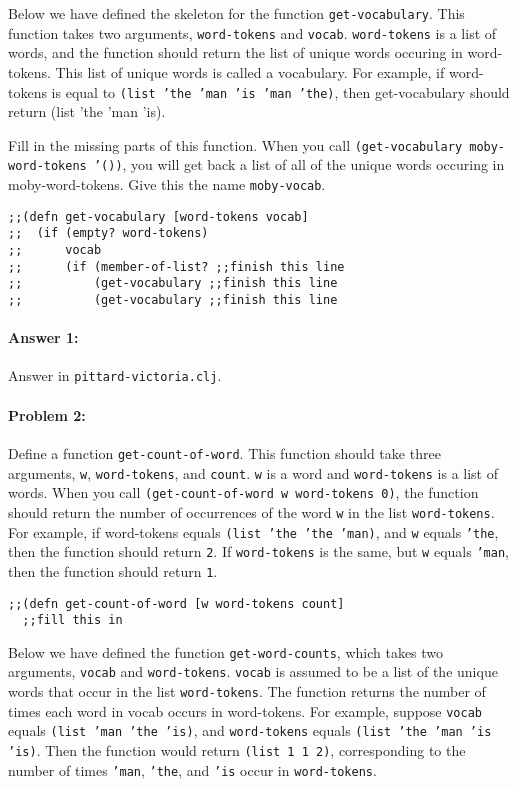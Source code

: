 \documentclass[10pt]{article}
\begin{document}
Below we have defined the skeleton for the function
\texttt{get-vocabulary}. This function takes two arguments,
\texttt{word-tokens} and \texttt{vocab}. \texttt{word-tokens} is a
list of words, and the function should return the list of unique words
occuring in word-tokens. This list of unique words is called a
vocabulary. For example, if word-tokens is equal to \texttt{(list 'the
  'man 'is 'man 'the)}, then get-vocabulary should return (list 'the
'man 'is).

Fill in the missing parts of this function. When you call
\texttt{(get-vocabulary moby-word-tokens '())}, you will get back a
list of all of the unique words occuring in moby-word-tokens. Give
this the name \texttt{moby-vocab}.

\begin{lstlisting}
;;(defn get-vocabulary [word-tokens vocab]
;;  (if (empty? word-tokens)
;;      vocab
;;      (if (member-of-list? ;;finish this line
;;          (get-vocabulary ;;finish this line
;;          (get-vocabulary ;;finish this line
\end{lstlisting}

\paragraph{Answer 1:} Answer in \texttt{pittard-victoria.clj}.

\hrulefill
\paragraph{Problem 2:}

Define a function \texttt{get-count-of-word}. This function should
take three arguments, \texttt{w}, \texttt{word-tokens}, and
\texttt{count}. \texttt{w} is a word and \texttt{word-tokens} is a
list of words. When you call \texttt{(get-count-of-word w word-tokens
  0)}, the function should return the number of occurrences of the
word \texttt{w} in the list \texttt{word-tokens}. For example, if
word-tokens equals \texttt{(list 'the 'the 'man)}, and \texttt{w}
equals \texttt{'the}, then the function should return \texttt{2}. If
\texttt{word-tokens} is the same, but \texttt{w} equals \texttt{'man},
then the function should return \texttt{1}.

\begin{lstlisting}
;;(defn get-count-of-word [w word-tokens count]
  ;;fill this in
\end{lstlisting}

Below we have defined the function \texttt{get-word-counts}, which
takes two arguments, \texttt{vocab} and
\texttt{word-tokens}. \texttt{vocab} is assumed to be a list of the
unique words that occur in the list \texttt{word-tokens}. The function
returns the number of times each word in vocab occurs in
word-tokens. For example, suppose \texttt{vocab} equals \texttt{(list
  'man 'the 'is)}, and \texttt{word-tokens} equals \texttt{(list 'the
  'man 'is 'is)}. Then the function would return \texttt{(list 1 1
  2)}, corresponding to the number of times \texttt{'man},
\texttt{'the}, and \texttt{'is} occur in \texttt{word-tokens}.
\end{document}
